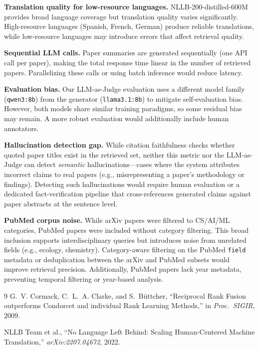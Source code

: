 \documentclass[11pt,a4paper]{article}
\begin{document}
\textbf{Translation quality for low-resource languages.} NLLB-200-distilled-600M provides broad language coverage but translation quality varies significantly. High-resource languages (Spanish, French, German) produce reliable translations, while low-resource languages may introduce errors that affect retrieval quality.

\textbf{Sequential LLM calls.} Paper summaries are generated sequentially (one API call per paper), making the total response time linear in the number of retrieved papers. Parallelizing these calls or using batch inference would reduce latency.

\textbf{Evaluation bias.} Our LLM-as-Judge evaluation uses a different model family (\texttt{qwen3:8b}) from the generator (\texttt{llama3.1:8b}) to mitigate self-evaluation bias. However, both models share similar training paradigms, so some residual bias may remain. A more robust evaluation would additionally include human annotators.

\textbf{Hallucination detection gap.} While citation faithfulness checks whether quoted paper titles exist in the retrieved set, neither this metric nor the LLM-as-Judge can detect \emph{semantic} hallucinations---cases where the system attributes incorrect claims to real papers (e.g., misrepresenting a paper's methodology or findings). Detecting such hallucinations would require human evaluation or a dedicated fact-verification pipeline that cross-references generated claims against paper abstracts at the sentence level.

\textbf{PubMed corpus noise.} While arXiv papers were filtered to CS/AI/ML categories, PubMed papers were included without category filtering. This broad inclusion supports interdisciplinary queries but introduces noise from unrelated fields (e.g., ecology, chemistry). Category-aware filtering on the PubMed \texttt{field} metadata or deduplication between the arXiv and PubMed subsets would improve retrieval precision. Additionally, PubMed papers lack year metadata, preventing temporal filtering or year-based analysis.

\begin{thebibliography}{9}
G.~V. Cormack, C.~L.~A. Clarke, and S.~B\"uttcher,
``Reciprocal Rank Fusion outperforms Condorcet and individual Rank Learning Methods,''
in \textit{Proc.\ SIGIR}, 2009.

NLLB Team et al.,
``No Language Left Behind: Scaling Human-Centered Machine Translation,''
\textit{arXiv:2207.04672}, 2022.
\end{thebibliography}
\end{document}
